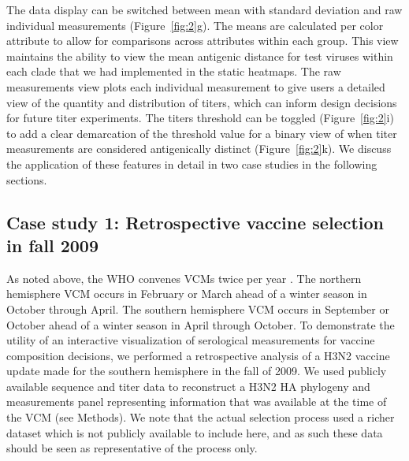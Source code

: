 \documentclass[utf8]{FrontiersinHarvard} %
\begin{document}
The data display can be switched between mean with standard deviation and raw individual measurements (Figure~\ref{fig:2}g).
The means are calculated per color attribute to allow for comparisons across attributes within each group.
This view maintains the ability to view the mean antigenic distance for test viruses within each clade that we had implemented in the static heatmaps.
The raw measurements view plots each individual measurement to give users a detailed view of the quantity and distribution of titers, which can inform design decisions for future titer experiments.
The titers threshold can be toggled (Figure~\ref{fig:2}i) to add a clear demarcation of the threshold value for a binary view of when titer measurements are considered antigenically distinct (Figure~\ref{fig:2}k).
We discuss the application of these features in detail in two case studies in the following sections.

\subsection{Case study 1: Retrospective vaccine selection in fall 2009}

As noted above, the WHO convenes VCMs twice per year \citep{Morris:2017ea}.
The northern hemisphere VCM occurs in February or March ahead of a winter season in October through April.
The southern hemisphere VCM occurs in September or October ahead of a winter season in April through October.
To demonstrate the utility of an interactive visualization of serological measurements for vaccine composition decisions, we performed a retrospective analysis of a H3N2 vaccine update made for the southern hemisphere in the fall of 2009.
We used publicly available sequence and titer data \citep{Bedford:2014bf} to reconstruct a H3N2 HA phylogeny and measurements panel representing information that was available at the time of the VCM (see Methods).
We note that the actual selection process used a richer dataset which is not publicly available to include here, and as such these data should be seen as representative of the process only.
\end{document}
